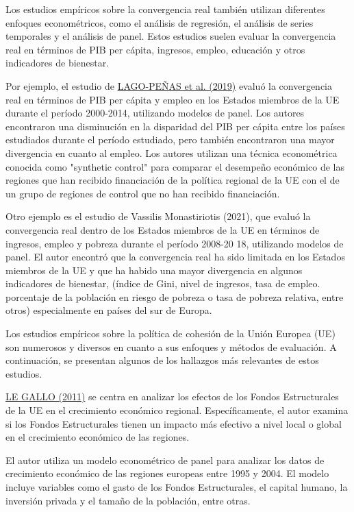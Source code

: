 \documentclass[10pt,a4paper]{article}
\begin{document}
Los estudios empíricos sobre la convergencia real también utilizan diferentes enfoques econométricos, como el análisis de regresión, el análisis de series temporales y el análisis de panel. Estos estudios suelen evaluar la convergencia real en términos de PIB per cápita, ingresos, empleo, educación y otros indicadores de bienestar.

Por ejemplo, el estudio de \href{https://www.researchgate.net/publication/318285230_The_Impact_of_the_Regional_Policy_on_the_European_Economy}{LAGO-PEÑAS et al. (2019)} evaluó la convergencia real en términos de PIB per cápita y empleo en los Estados miembros de la UE durante el período 2000-2014, utilizando modelos de panel. Los autores encontraron una disminución en la disparidad del PIB per cápita entre los países estudiados durante el período estudiado, pero también encontraron una mayor divergencia en cuanto al empleo. Los autores utilizan una técnica econométrica conocida como "synthetic control" para comparar el desempeño económico de las regiones que han recibido financiación de la política regional de la UE con el de un grupo de regiones de control que no han recibido financiación.

Otro ejemplo es el estudio de Vassilis Monastiriotis (2021), que evaluó la convergencia real dentro de los Estados miembros de la UE en términos de ingresos, empleo y pobreza durante el período 2008-20 18, utilizando modelos de panel. El autor encontró que la convergencia real ha sido limitada en los Estados miembros de la UE y que ha habido una mayor divergencia en algunos indicadores de bienestar, (índice de Gini, nivel de ingresos, tasa de empleo. porcentaje de la población en riesgo de pobreza o tasa de pobreza relativa, entre otros) especialmente en países del sur de Europa.

Los estudios empíricos sobre la política de cohesión de la Unión Europea (UE) son numerosos y diversos en cuanto a sus enfoques y métodos de evaluación. A continuación, se presentan algunos de los hallazgos más relevantes de estos estudios. 

\href{https://onlinelibrary-wiley-com.sire.ub.edu/doi/10.1111/j.1468-2257.2011.00564.x}{LE GALLO (2011)} se centra en analizar los efectos de los Fondos Estructurales de la UE en el crecimiento económico regional. Específicamente, el autor examina si los Fondos Estructurales tienen un impacto más efectivo a nivel local o global en el crecimiento económico de las regiones.

El autor utiliza un modelo econométrico de panel para analizar los datos de crecimiento económico de las regiones europeas entre 1995 y 2004. El modelo incluye variables como el gasto de los Fondos Estructurales, el capital humano, la inversión privada y el tamaño de la población, entre otras. 
\end{document}
